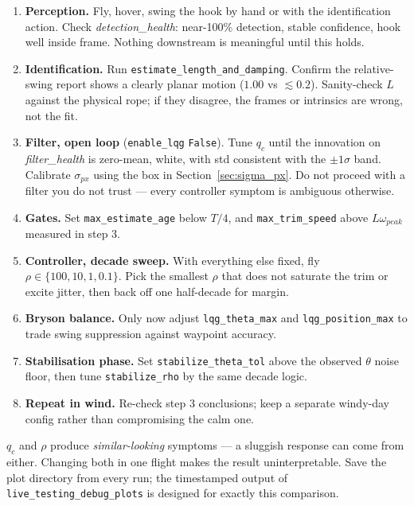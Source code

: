 \documentclass[11pt,a4paper]{article}
\newcommand{\param}[1]{\texttt{\small #1}}
\newcommand{\plot}[1]{\textit{#1}}
\begin{document}
\begin{enumerate}[leftmargin=*,itemsep=4pt]
\item \textbf{Perception.} Fly, hover, swing the hook by hand or with the
identification action. Check \plot{detection\_health}: near-100\% detection,
stable confidence, hook well inside frame. Nothing downstream is meaningful
until this holds.

\item \textbf{Identification.} Run \texttt{estimate\_length\_and\_damping}.
Confirm the relative-swing report shows a clearly planar motion
($1.00$ vs $\lesssim0.2$). Sanity-check $L$ against the physical rope; if they
disagree, the frames or intrinsics are wrong, not the fit.

\item \textbf{Filter, open loop} (\param{enable\_lqg} \texttt{False}). Tune
$q_c$ until the innovation on \plot{filter\_health} is zero-mean, white, with
std consistent with the $\pm1\sigma$ band. Calibrate $\sigma_{px}$ using the
box in Section~\ref{sec:sigma_px}. Do not proceed with a filter you do not
trust --- every controller symptom is ambiguous otherwise.

\item \textbf{Gates.} Set \param{max\_estimate\_age} below $T/4$, and
\param{max\_trim\_speed} above $L\omega_{peak}$ measured in step 3.

\item \textbf{Controller, decade sweep.} With everything else fixed, fly
$\rho\in\{100,10,1,0.1\}$. Pick the smallest $\rho$ that does not saturate the
trim or excite jitter, then back off one half-decade for margin.

\item \textbf{Bryson balance.} Only now adjust \param{lqg\_theta\_max} and
\param{lqg\_position\_max} to trade swing suppression against waypoint
accuracy.

\item \textbf{Stabilisation phase.} Set \param{stabilize\_theta\_tol} above the
observed $\theta$ noise floor, then tune \param{stabilize\_rho} by the same
decade logic.

\item \textbf{Repeat in wind.} Re-check step 3 conclusions; keep a separate
windy-day config rather than compromising the calm one.
\end{enumerate}

\begin{tcolorbox}[colback=green!4,colframe=green!45!black,title=\textbf{One change at a time},fonttitle=\bfseries\small]
$q_c$ and $\rho$ produce \emph{similar-looking} symptoms --- a sluggish response
can come from either. Changing both in one flight makes the result
uninterpretable. Save the plot directory from every run; the timestamped output
of \param{live\_testing\_debug\_plots} is designed for exactly this comparison.
\end{tcolorbox}
\end{document}

